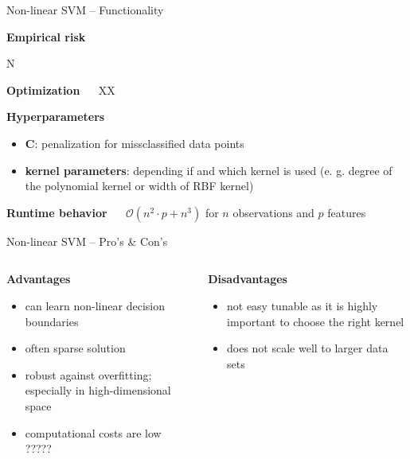 \documentclass[11pt,compress,t,notes=noshow, xcolor=table]{beamer}
\newcommand{\highlight}[1]{\textcolor{highlightcol}{\textbf{#1}}}
\newcommand{\positem}{\item[$\highlight{+}$]}
\newcommand{\negitem}{\item[$\highlight{-}$]}
\newcommand{\conclbox}[1]{\fbox{\parbox{\textwidth}{\centering\textbf{#1}}}}
\begin{document}

\begin{frame}{Non-linear SVM -- Functionality}

\footnotesize

\highlight{Empirical risk}

N

\medskip

\highlight{Optimization} ~~
XX

\medskip

\highlight{Hyperparameters}

\begin{itemize}
  \item \textbf{C}: penalization for missclassified data points 
  \item \textbf{kernel parameters}: depending if and which kernel is used (e. g. degree of the polynomial kernel or width of RBF kernel)

\end{itemize}

\medskip

\highlight{Runtime behavior} ~~ $\mathcal{O}(n^2 \cdot p + n^3)$ for $n$ 
observations and $p$ features

\end{frame}


\begin{frame}{Non-linear SVM -- Pro's \& Con's}

\footnotesize


\begin{columns}[onlytextwidth]
  \begin{column}{0.5\textwidth}
    \highlight{Advantages}
    \footnotesize
    \begin{itemize}
      \positem can learn non-linear decision boundaries
      \positem often sparse solution
      \positem robust against overfitting; especially in high-dimensional space 
      \positem computational costs are low ????? 
    \end{itemize}
  \end{column}

  \begin{column}{0.5\textwidth}
    \highlight{Disadvantages}
    \footnotesize
    \begin{itemize}
      \negitem not easy tunable as it is highly important to choose the right kernel
      \negitem does not scale well to larger data sets
    \end{itemize}
  \end{column}
\end{columns}

\vfill

\small

\conclbox{XX}

\end{frame}
\end{document}
